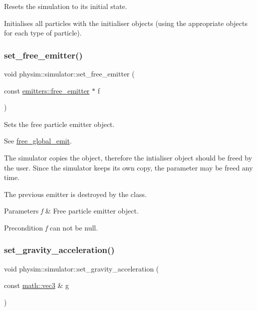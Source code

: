 Resets the simulation to its initial state. 

Initialises all particles with the initialiser objects (using the appropriate objects for each type of particle). \mbox{\label{classphysim_1_1simulator_a83ab26eaa30b62959f6afcb9ec58696f}} 
\subsubsection{\texorpdfstring{set\+\_\+free\+\_\+emitter()}{set\_free\_emitter()}}
{\footnotesize\ttfamily void physim\+::simulator\+::set\+\_\+free\+\_\+emitter (\begin{DoxyParamCaption}\item[{const \hyperlink{classphysim_1_1emitters_1_1free__emitter}{emitters\+::free\+\_\+emitter} $\ast$}]{f }\end{DoxyParamCaption})}



Sets the free particle emitter object. 

See \hyperlink{classphysim_1_1simulator_a05e2840fc39c644d7005ea938e63202f}{free\+\_\+global\+\_\+emit}.

The simulator copies the object, therefore the intialiser object should be freed by the user. Since the simulator keeps its own copy, the parameter may be freed any time.

The previous emitter is destroyed by the class. 
\begin{DoxyParams}{Parameters}
{\em f} & Free particle emitter object. \\
\hline
\end{DoxyParams}
\begin{DoxyPrecond}{Precondition}
{\itshape f} can not be null. 
\end{DoxyPrecond}
\mbox{\label{classphysim_1_1simulator_a11d8e86465d367b9907bd541964d5a4b}} 
\subsubsection{\texorpdfstring{set\+\_\+gravity\+\_\+acceleration()}{set\_gravity\_acceleration()}}
{\footnotesize\ttfamily void physim\+::simulator\+::set\+\_\+gravity\+\_\+acceleration (\begin{DoxyParamCaption}\item[{const \hyperlink{structphysim_1_1math_1_1vec3}{math\+::vec3} \&}]{g }\end{DoxyParamCaption})}



